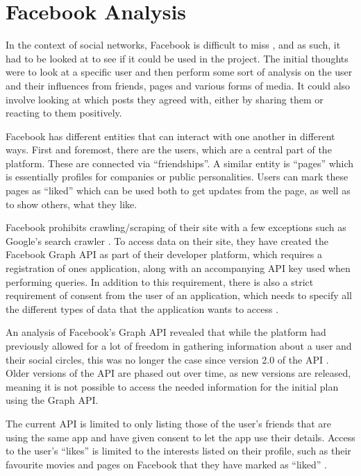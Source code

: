 \chapter{Facebook Analysis}\label{chap:facebook-analysis}
In the context of social networks, Facebook is difficult to miss
\citep{FacebookPopularity}, and as such, it had to be looked at to see if it
could be used in the project.
The initial thoughts were to look at a specific user and then perform some sort of analysis on the user and their
influences from friends, pages and various forms of media.
It could also involve looking at which posts they agreed with, either by sharing
them or reacting to them positively.\nl

Facebook has different entities that can interact with one another in different ways.
First and foremost, there are the users, which are a central part of the
platform. These are connected via ``friendships''.
A similar entity is ``pages'' which is essentially profiles for companies or
public personalities.
Users can mark these pages as ``liked'' which can be used both to get updates
from the page, as well as to show others, what they like.\nl

Facebook prohibits crawling/scraping of their site with a few exceptions such as
Google's search crawler \Source.
To access data on their site, they have created the Facebook Graph API as part
of their developer platform, which requires a registration of ones application, along with an accompanying API key used when performing queries.
In addition to this requirement, there is also a strict requirement of consent
from the user of an application, which needs to specify all the different types
of data that the application wants to access \Source.\nl

An analysis of Facebook's Graph API \Source revealed that while the platform had
previously allowed for a lot of freedom in gathering information about a user
and their social circles, this was no longer the case since version 2.0 of the
API \Source.
Older versions of the API are phased out over time, as new versions are released, meaning it is not possible to access
the needed information for the initial plan using the Graph
API.\nl

The current API is limited to only listing those of the user's friends that are using the same app and have given
consent to let the app use their details.
Access to the user's ``likes'' is limited to the interests listed on their profile, such as their favourite movies and
pages on Facebook that they have marked as ``liked'' \Source.\nl

